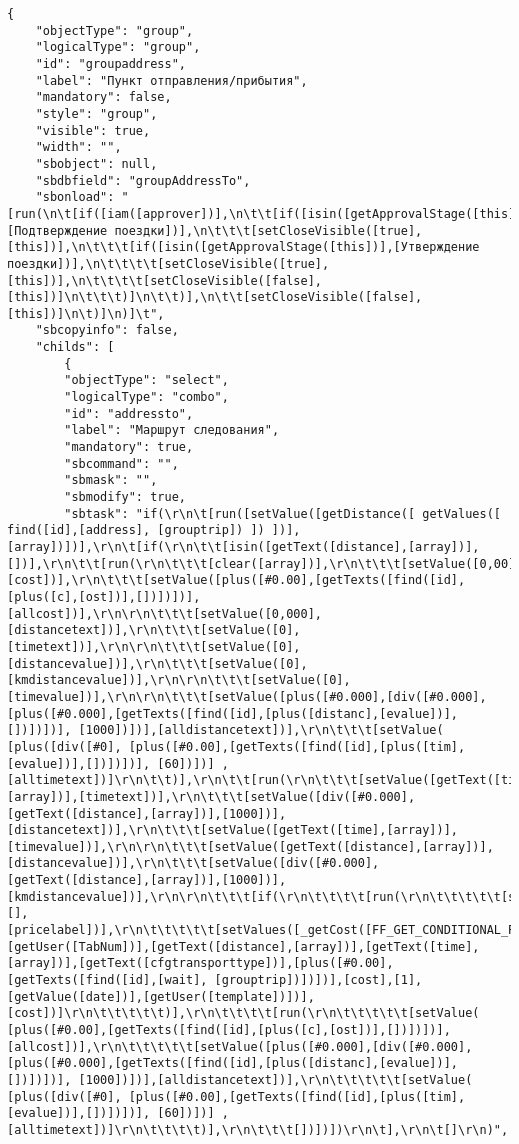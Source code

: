 \documentclass[../index.tex]{subfiles}
\begin{document}
\begin{verbatim}
{
    "objectType": "group",
    "logicalType": "group",
    "id": "groupaddress",
    "label": "Пункт отправления/прибытия",
    "mandatory": false,
    "style": "group",
    "visible": true,
    "width": "",
    "sbobject": null,
    "sbdbfield": "groupAddressTo",
    "sbonload": "[run(\n\t[if([iam([approver])],\n\t\t[if([isin([getApprovalStage([this])],[Подтверждение поездки])],\n\t\t\t[setCloseVisible([true],[this])],\n\t\t\t[if([isin([getApprovalStage([this])],[Утверждение поездки])],\n\t\t\t\t[setCloseVisible([true],[this])],\n\t\t\t\t[setCloseVisible([false],[this])]\n\t\t\t)]\n\t\t)],\n\t\t[setCloseVisible([false],[this])]\n\t)]\n)]\t",
    "sbcopyinfo": false,
    "childs": [
        {
        "objectType": "select",
        "logicalType": "combo",
        "id": "addressto",
        "label": "Маршрут следования",
        "mandatory": true,
        "sbcommand": "",
        "sbmask": "",
        "sbmodify": true,
        "sbtask": "if(\r\n\t[run([setValue([getDistance([ getValues([ find([id],[address], [grouptrip]) ]) ])],[array])])],\r\n\t[if(\r\n\t\t[isin([getText([distance],[array])],[])],\r\n\t\t[run(\r\n\t\t\t[clear([array])],\r\n\t\t\t[setValue([0,00],[cost])],\r\n\t\t\t[setValue([plus([#0.00],[getTexts([find([id],[plus([c],[ost])],[])])])],[allcost])],\r\n\r\n\t\t\t[setValue([0,000],[distancetext])],\r\n\t\t\t[setValue([0],[timetext])],\r\n\r\n\t\t\t[setValue([0],[distancevalue])],\r\n\t\t\t[setValue([0],[kmdistancevalue])],\r\n\r\n\t\t\t[setValue([0],[timevalue])],\r\n\r\n\t\t\t[setValue([plus([#0.000],[div([#0.000], [plus([#0.000],[getTexts([find([id],[plus([distanc],[evalue])],[])])])], [1000])])],[alldistancetext])],\r\n\t\t\t[setValue( [plus([div([#0], [plus([#0.00],[getTexts([find([id],[plus([tim],[evalue])],[])])])], [60])])] ,[alltimetext])]\r\n\t\t)],\r\n\t\t[run(\r\n\t\t\t[setValue([getText([time_text],[array])],[timetext])],\r\n\t\t\t[setValue([div([#0.000],[getText([distance],[array])],[1000])],[distancetext])],\r\n\t\t\t[setValue([getText([time],[array])],[timevalue])],\r\n\r\n\t\t\t[setValue([getText([distance],[array])],[distancevalue])],\r\n\t\t\t[setValue([div([#0.000],[getText([distance],[array])],[1000])],[kmdistancevalue])],\r\n\r\n\t\t\t[if(\r\n\t\t\t\t[run(\r\n\t\t\t\t\t[setValid([true],[],[pricelabel])],\r\n\t\t\t\t\t[setValues([_getCost([FF_GET_CONDITIONAL_PRICE_DOUBLE],[getUser([TabNum])],[getText([distance],[array])],[getText([time],[array])],[getText([cfgtransporttype])],[plus([#0.00],[getTexts([find([id],[wait], [grouptrip])])])],[cost],[1],[getValue([date])],[getUser([template])])],[cost])]\r\n\t\t\t\t\t)],\r\n\t\t\t\t[run(\r\n\t\t\t\t\t[setValue( [plus([#0.00],[getTexts([find([id],[plus([c],[ost])],[])])])], [allcost])],\r\n\t\t\t\t\t[setValue([plus([#0.000],[div([#0.000], [plus([#0.000],[getTexts([find([id],[plus([distanc],[evalue])],[])])])], [1000])])],[alldistancetext])],\r\n\t\t\t\t\t[setValue( [plus([div([#0], [plus([#0.00],[getTexts([find([id],[plus([tim],[evalue])],[])])])], [60])])] ,[alltimetext])]\r\n\t\t\t\t)],\r\n\t\t\t[])])])\r\n\t],\r\n\t[]\r\n)",

\end{verbatim}
\end{document}
